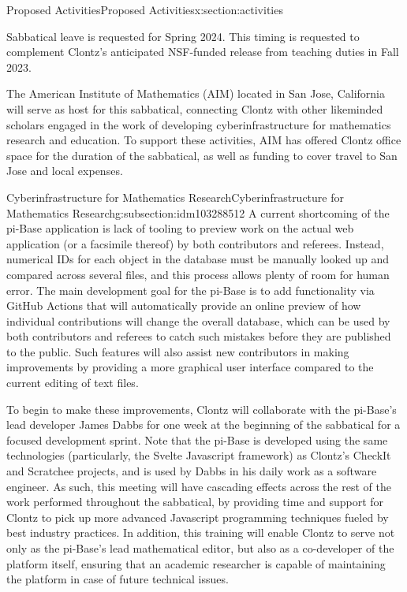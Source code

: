 \documentclass[oneside,10pt,]{article}
\begin{document}
%
%
\typeout{************************************************}
\typeout{************************************************}
%
\begin{sectionptx}{Proposed Activities}{}{Proposed Activities}{}{}{x:section:activities}
\begin{introduction}{}%
Sabbatical leave is requested for Spring 2024. This timing is requested to complement Clontz's anticipated NSF-funded release from teaching duties in Fall 2023.%
\par
The American Institute of Mathematics (AIM) located in San Jose, California will serve as host for this sabbatical, connecting Clontz with other likeminded scholars engaged in the work of developing cyberinfrastructure for mathematics research and education. To support these activities, AIM has offered Clontz office space for the duration of the sabbatical, as well as funding to cover travel to San Jose and local expenses.%
\end{introduction}%
%
%
\typeout{************************************************}
\typeout{************************************************}
%
\begin{subsectionptx}{Cyberinfrastructure for Mathematics Research}{}{Cyberinfrastructure for Mathematics Research}{}{}{g:subsection:idm103288512}
A current shortcoming of the pi-Base application is lack of tooling to preview work on the actual web application (or a facsimile thereof) by both contributors and referees. Instead, numerical IDs for each object in the database must be manually looked up and compared across several files, and this process allows plenty of room for human error. The main development goal for the pi-Base is to add functionality via GitHub Actions that will automatically provide an online preview of how individual contributions will change the overall database, which can be used by both contributors and referees to catch such mistakes before they are published to the public. Such features will also assist new contributors in making improvements by providing a more graphical user interface compared to the current editing of text files.%
\par
To begin to make these improvements, Clontz will collaborate with the pi-Base's lead developer James Dabbs for one week at the beginning of the sabbatical for a focused development sprint. Note that the pi-Base is developed using the same technologies (particularly, the Svelte Javascript framework) as Clontz's CheckIt and Scratchee projects, and is used by Dabbs in his daily work as a software engineer. As such, this meeting will have cascading effects across the rest of the work performed throughout the sabbatical, by providing time and support for Clontz to pick up more advanced Javascript programming techniques fueled by best industry practices. In addition, this training will enable Clontz to serve not only as the pi-Base's lead mathematical editor, but also as a co-developer of the platform itself, ensuring that an academic researcher is capable of maintaining the platform in case of future technical issues.%

\end{subsectionptx}
\end{sectionptx}
\end{document}
